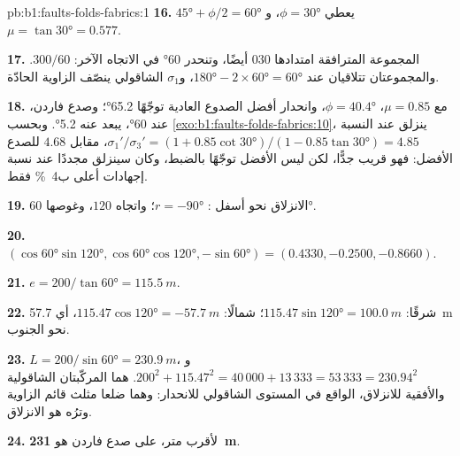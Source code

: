 \begin{solution}{pb:b1:faults-folds-fabrics:1}
\textbf{16.} $\ang{45} + \phi/2 = \ang{60}$ يعطي $\phi = \ang{30}$، و
$\mu = \tan\ang{30} = 0.577$.

\textbf{17.} المجموعة المترافقة امتدادها $030$ أيضًا، وتنحدر \ang{60} في الاتجاه الآخر: $300/60$. والمجموعتان تتلاقيان عند $\ang{180} - 2\times\ang{60} = \ang{60}$، و$\sigma_1$ الشاقولي ينصّف الزاوية الحادّة.

\textbf{18.} مع $\mu = 0.85$، $\phi = \ang{40.4}$، وانحدار أفضل الصدوع العادية توجّهًا \ang{65.2}؛ وصدع فاردن، عند \ang{60}، يبعد عنه \ang{5.2}. وبحسب \cref{exo:b1:faults-folds-fabrics:10}، ينزلق عند النسبة
$\sigma_1'/\sigma_3' = (1 + 0.85\cot\ang{30})/(1 - 0.85\tan\ang{30}) = 4.85$،
مقابل $4.68$ للصدع الأفضل: فهو قريب جدًّا، لكن ليس الأفضل توجّهًا بالضبط، وكان سينزلق مجددًا عند نسبة إجهادات أعلى ب\qty{4}{\percent} فقط.

\textbf{19.} الانزلاق نحو أسفل : $r = \ang{-90}$؛ واتجاه  $120$، وغوصها \ang{60}.

\textbf{20.} $(\cos\ang{60}\sin\ang{120}, \cos\ang{60}\cos\ang{120},
-\sin\ang{60}) = (0.4330, -0.2500, -0.8660)$.

\textbf{21.} $e = 200/\tan\ang{60} = \qty{115.5}{m}$.

\textbf{22.} شرقًا: $115.47\sin\ang{120} = \qty{100.0}{m}$؛ شمالًا:
$115.47\cos\ang{120} = \qty{-57.7}{m}$، أي \qty{57.7}{m} نحو الجنوب.

\textbf{23.} $L = 200/\sin\ang{60} = \qty{230.9}{m}$، و
$200^2 + 115.47^2 = 40\,000 + 13\,333 = 53\,333 = 230.94^2$.   هما المركّبتان الشاقولية والأفقية للانزلاق، الواقع في المستوى الشاقولي للانحدار: وهما ضلعا مثلث قائم الزاوية وترُه هو الانزلاق.

\textbf{24.} لأقرب متر،  على صدع فاردن هو
\textbf{\qty[text-series-to-math=true]{231}{m}}.
\end{solution}
